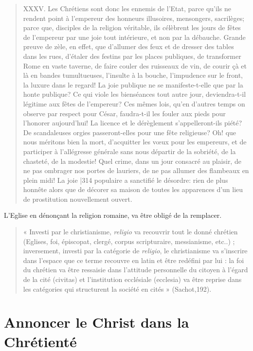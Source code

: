 \begin{quote}
    XXXV. Les Chrétiens sont donc les ennemis de l'Etat, parce qu'ils ne rendent point à l'empereur des honneurs illusoires, mensongers, sacrilèges; parce que, disciples de la religion véritable, ils célèbrent les jours de fêtes de l'empereur par une joie tout intérieure, et non par la débauche. Grande preuve de zèle, en effet, que d'allumer des feux et de dresser des tables dans les rues, d'étaler des festins par les places publiques, de transformer Rome en vaste taverne, de faire couler des ruisseaux de vin, de courir çà et là en bandes tumultueuses, l'insulte à la bouche, l'impudence sur le front, la luxure dans le regard! La joie publique ne se manifeste-t-elle que par la honte publique? Ce qui viole les bienséances tout autre jour, deviendra-t-il légitime aux fêtes de l'empereur? Ces mêmes lois, qu'en d'autres temps on observe par respect pour César, faudra-t-il les fouler aux pieds pour l'honorer aujourd'hui! La licence et le dérèglement s'appelleront-ils piété? De scandaleuses orgies passeront-elles pour une fête religieuse? Oh! que nous méritons bien la mort, d'acquitter les vœux pour les empereurs, et de participer à l'allégresse générale sans nous départir de la sobriété, de la chasteté, de la modestie! Quel crime, dans un jour consacré au plaisir, de ne pas ombrager nos portes de lauriers, de ne pas allumer des flambeaux en plein midi! La joie |314 populaire a sanctifié le désordre: rien de plus honnête alors que de décorer sa maison de toutes les apparences d'un lieu de prostitution nouvellement ouvert.
\end{quote}
 
 L'Eglise en dénonçant la religion romaine, va être obligé de la remplacer. 

\begin{quote}
     « Investi par le christianisme, \textit{religio} va recouvrir tout le donné chrétien (Eglises, foi, épiscopat, clergé, corpus scripturaire, messianisme, etc..) ; inversement, investi par la catégorie de \textit{religio}, le christianisme va s’inscrire dans l’espace que ce terme recouvre en latin et être redéfini par lui : la foi du chrétien va être ressaisie dans l’attitude personnelle du citoyen à l’égard de la cité (civitas) et l’institution ecclésiale (ecclesia) va être reprise dans les catégories qui structurent la société en cités » (Sachot,192).
\end{quote}


\section{Annoncer le Christ dans la Chrétienté}

